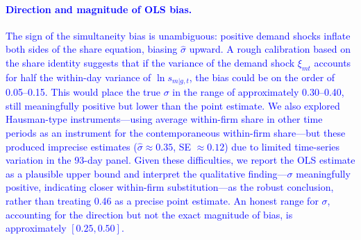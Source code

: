 \documentclass[11pt, a4paper]{article}
\begin{document}
\textcolor{blue}{\paragraph{Direction and magnitude of OLS bias.} The sign of the simultaneity bias is unambiguous: positive demand shocks inflate both sides of the share equation, biasing $\hat{\sigma}$ upward. A rough calibration based on the share identity suggests that if the variance of the demand shock $\xi_{mt}$ accounts for half the within-day variance of $\ln s_{m|g,t}$, the bias could be on the order of 0.05--0.15. This would place the true $\sigma$ in the range of approximately 0.30--0.40, still meaningfully positive but lower than the point estimate. We also explored Hausman-type instruments---using average within-firm share in other time periods as an instrument for the contemporaneous within-firm share---but these produced imprecise estimates ($\hat{\sigma} \approx 0.35$, SE $\approx 0.12$) due to limited time-series variation in the 93-day panel. Given these difficulties, we report the OLS estimate as a plausible upper bound and interpret the qualitative finding---$\sigma$ meaningfully positive, indicating closer within-firm substitution---as the robust conclusion, rather than treating 0.46 as a precise point estimate. An honest range for $\sigma$, accounting for the direction but not the exact magnitude of bias, is approximately $[0.25, 0.50]$.}
\end{document}
